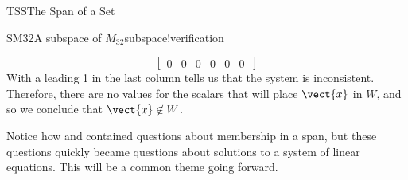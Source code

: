 \begin{subsect}{TSS}{The Span of a Set}
\begin{example}{SM32}{A subspace of $M_{32}$}{subspace!verification}
\begin{para}
\begin{equation*}
\begin{bmatrix}
0 & 0 & 0 & 0 & 0 & 0\
\end{bmatrix}
\end{equation*}
%
With a leading 1 in the last column  tells us that the system is inconsistent.  Therefore, there are no values for the scalars that will place $\vect{x}$ in $W$, and so we conclude that $\vect{x}\not\in W$.
\end{para}
%
\end{example}
%
\begin{para}Notice how   and  contained questions about membership in a span, but these questions quickly became questions about solutions to a system of linear equations.  This will be a common theme going forward.\end{para}
%
\end{subsect}
%

